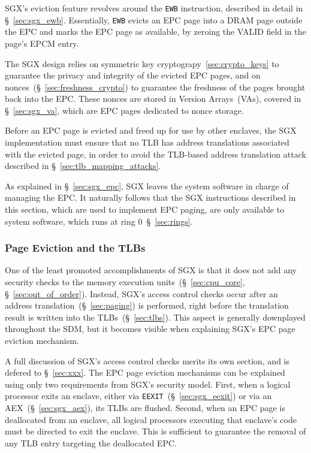 SGX's eviction feature revolves around the \texttt{EWB} instruction, described
in detail in \S~\ref{sec:sgx_ewb}. Essentially, \texttt{EWB} evicts an EPC page
into a DRAM page outside the EPC and marks the EPC page as available, by
zeroing the VALID field in the page's EPCM entry.

The SGX design relies on symmetric key cryptograpy~\ref{sec:crypto_keys} to
guarantee the privacy and integrity of the evicted EPC pages, and on
nonces~(\S~\ref{sec:freshness_crypto}) to guarantee the freshness of the pages
brought back into the EPC. These nonces are stored in Version Arrays~(VAs),
covered in \S~\ref{sec:sgx_va}, which are EPC pages dedicated to nonce storage.

Before an EPC page is evicted and freed up for use by other enclaves, the SGX
implementation must ensure that no TLB has address translations associated with
the evicted page, in order to avoid the TLB-based address translation attack
described in \S~\ref{sec:tlb_mapping_attacks}.

As explained in \S~\ref{sec:sgx_epc}, SGX leaves the system software in charge
of managing the EPC. It naturally follows that the SGX instructions described
in this section, which are used to implement EPC paging, are only available to
system software, which runs at ring 0~\S~\ref{sec:rings}.


\subsubsection{Page Eviction and the TLBs}
\label{sec:sgx_eblock}

One of the least promoted accomplishments of SGX is that it does not add any
security checks to the memory execution units~(\S~\ref{sec:cpu_core},
\S~\ref{sec:out_of_order}). Instead, SGX's access control checks occur after an
address translation~(\S~\ref{sec:paging}) is performed, right before the
translation result is written into the TLBs~(\S~\ref{sec:tlbs}). This aspect
is generally downplayed throughout the SDM, but it becomes visible when
explaining SGX's EPC page eviction mechanism.

A full discussion of SGX's access control checks merits its own section, and is
defered to \S~\ref{sec:xxx}. The EPC page eviction mechanisms can be explained
using only two requirements from SGX's security model. First, when a logical
processor exits an enclave, either via
\texttt{EEXIT}~(\S~\ref{sec:sgx_eexit}) or via an AEX~(\S~\ref{sec:sgx_aex}),
its TLBs are flushed. Second, when an EPC page is deallocated from an enclave,
all logical processors executing that enclave's code must be directed to exit
the enclave. This is sufficient to guarantee the removal of any TLB entry
targeting the deallocated EPC.

